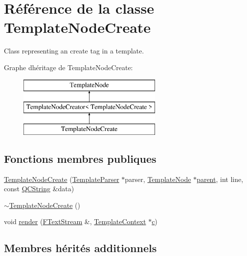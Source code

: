 \hypertarget{class_template_node_create}{}\section{Référence de la classe Template\+Node\+Create}
\label{class_template_node_create}


Class representing an \textquotesingle{}create\textquotesingle{} tag in a template.  


Graphe d\textquotesingle{}héritage de Template\+Node\+Create\+:\begin{figure}[H]
\begin{center}
\leavevmode
\includegraphics[height=3.000000cm]{class_template_node_create}
\end{center}
\end{figure}
\subsection*{Fonctions membres publiques}
\begin{DoxyCompactItemize}
\item 
\hyperlink{class_template_node_create_aaff38b23cc47e0e70fdf5aebe2bbf7c0}{Template\+Node\+Create} (\hyperlink{class_template_parser}{Template\+Parser} $\ast$parser, \hyperlink{class_template_node}{Template\+Node} $\ast$\hyperlink{class_template_node_a69a306ef84e62af9fe57bf9aacc94536}{parent}, int line, const \hyperlink{class_q_c_string}{Q\+C\+String} \&data)
\item 
\hyperlink{class_template_node_create_ab157f1598952d734fda0e35a4975cffc}{$\sim$\+Template\+Node\+Create} ()
\item 
void \hyperlink{class_template_node_create_a9d45855984c41d86b4554576bcda9d51}{render} (\hyperlink{class_f_text_stream}{F\+Text\+Stream} \&, \hyperlink{class_template_context}{Template\+Context} $\ast$\hyperlink{060__command__switch_8tcl_ab14f56bc3bd7680490ece4ad7815465f}{c})
\end{DoxyCompactItemize}
\subsection*{Membres hérités additionnels}


